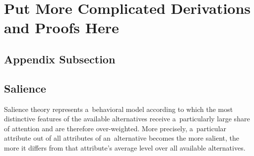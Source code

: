 


\section{Put More Complicated Derivations and Proofs Here}
\label{sec:app:derivations}

\subsection{Appendix Subsection}
\label{sec:app:derivations:one}

\blindmathtrue
\Blindtext[4]

\subsection{Salience}
\label{sec:app:salience}

Salience theory \citep{Bordalo2012, Bordalo2013} represents a~behavioral model according to which the most distinctive features of the available alternatives receive a~particularly large share of attention and are therefore over-weighted. More precisely, a~particular attribute out of all attributes of an~alternative becomes the more salient, the more it differs from that attribute's average level over all available alternatives.

